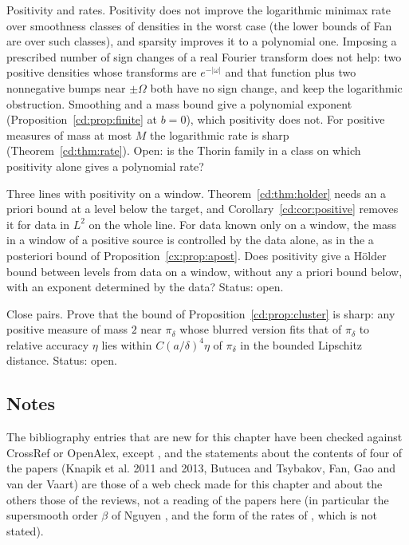 \begin{problem}\label{cd:prob:rates}
Positivity and rates. Positivity does not improve the logarithmic minimax rate over smoothness classes of densities in the worst case (the lower bounds of Fan \cite{Fan91} are over such classes), and sparsity improves it to a polynomial one. Imposing a prescribed number of sign changes of a real Fourier transform does not help: two positive densities whose transforms are $e^{-\lvert\omega\rvert}$ and that function plus two nonnegative bumps near $\pm\Omega$ both have no sign change, and keep the logarithmic obstruction. Smoothing and a mass bound give a polynomial exponent (Proposition~\ref{cd:prop:finite} at $b=0$), which positivity does not. For positive measures of mass at most $M$ the logarithmic rate is sharp (Theorem~\ref{cd:thm:rate}). Open: is the Thorin family in a class on which positivity alone gives a polynomial rate?
\end{problem}

\begin{problem}\label{cd:prob:three}
Three lines with positivity on a window. Theorem~\ref{cd:thm:holder} needs an a priori bound at a level below the target, and Corollary~\ref{cd:cor:positive} removes it for data in $L^2$ on the whole line. For data known only on a window, the mass in a window of a positive source is controlled by the data alone, as in the a posteriori bound of Proposition~\ref{cx:prop:apost}. Does positivity give a H\"older bound between levels from data on a window, without any a priori bound below, with an exponent determined by the data? Status: open.
\end{problem}

\begin{problem}\label{cd:prob:cluster}
Close pairs. Prove that the bound of Proposition~\ref{cd:prop:cluster} is sharp: any positive measure of mass $2$ near $\pi_\delta$ whose blurred version fits that of $\pi_\delta$ to relative accuracy $\eta$ lies within $C(a/\delta)^4\eta$ of $\pi_\delta$ in the bounded Lipschitz distance. Status: open.
\end{problem}

\subsection*{Notes}

The bibliography entries that are new for this chapter have been checked against CrossRef or OpenAlex, except \cite{Hadamard23}, and the statements about the contents of four of the papers (Knapik et al. 2011 and 2013, Butucea and Tsybakov, Fan, Gao and van der Vaart) are those of a web check made for this chapter and about the others those of the reviews, not a reading of the papers here (in particular the supersmooth order $\beta$ of Nguyen \cite{Nguyen13}, and the form of the rates of \cite{KnapikVZ13}, which is not stated).
